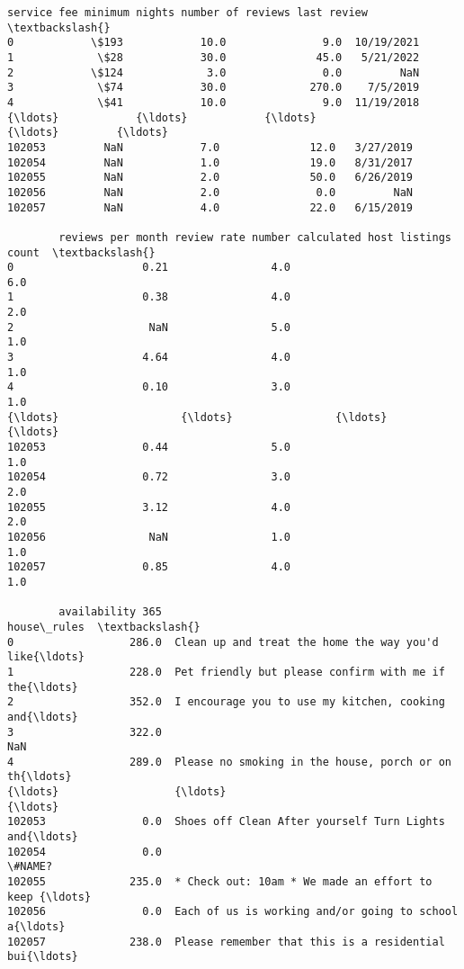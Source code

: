 \documentclass[11pt]{article}
\begin{document}
\begin{tcolorbox}[breakable, size=fbox, boxrule=.5pt, pad at break*=1mm, opacityfill=0]
\begin{Verbatim}[commandchars=\\\{\}]
       service fee minimum nights number of reviews last review  \textbackslash{}
0            \$193            10.0               9.0  10/19/2021
1             \$28            30.0              45.0   5/21/2022
2            \$124             3.0               0.0         NaN
3             \$74            30.0             270.0    7/5/2019
4             \$41            10.0               9.0  11/19/2018
{\ldots}            {\ldots}            {\ldots}               {\ldots}         {\ldots}
102053         NaN            7.0              12.0   3/27/2019
102054         NaN            1.0              19.0   8/31/2017
102055         NaN            2.0              50.0   6/26/2019
102056         NaN            2.0               0.0         NaN
102057         NaN            4.0              22.0   6/15/2019

        reviews per month review rate number calculated host listings count  \textbackslash{}
0                    0.21                4.0                            6.0
1                    0.38                4.0                            2.0
2                     NaN                5.0                            1.0
3                    4.64                4.0                            1.0
4                    0.10                3.0                            1.0
{\ldots}                   {\ldots}                {\ldots}                            {\ldots}
102053               0.44                5.0                            1.0
102054               0.72                3.0                            2.0
102055               3.12                4.0                            2.0
102056                NaN                1.0                            1.0
102057               0.85                4.0                            1.0

        availability 365                                        house\_rules  \textbackslash{}
0                  286.0  Clean up and treat the home the way you'd like{\ldots}
1                  228.0  Pet friendly but please confirm with me if the{\ldots}
2                  352.0  I encourage you to use my kitchen, cooking and{\ldots}
3                  322.0                                                NaN
4                  289.0  Please no smoking in the house, porch or on th{\ldots}
{\ldots}                  {\ldots}                                                {\ldots}
102053               0.0  Shoes off Clean After yourself Turn Lights and{\ldots}
102054               0.0                                             \#NAME?
102055             235.0  * Check out: 10am * We made an effort to keep {\ldots}
102056               0.0  Each of us is working and/or going to school a{\ldots}
102057             238.0  Please remember that this is a residential bui{\ldots}


\end{Verbatim}
\end{tcolorbox}
\end{document}
